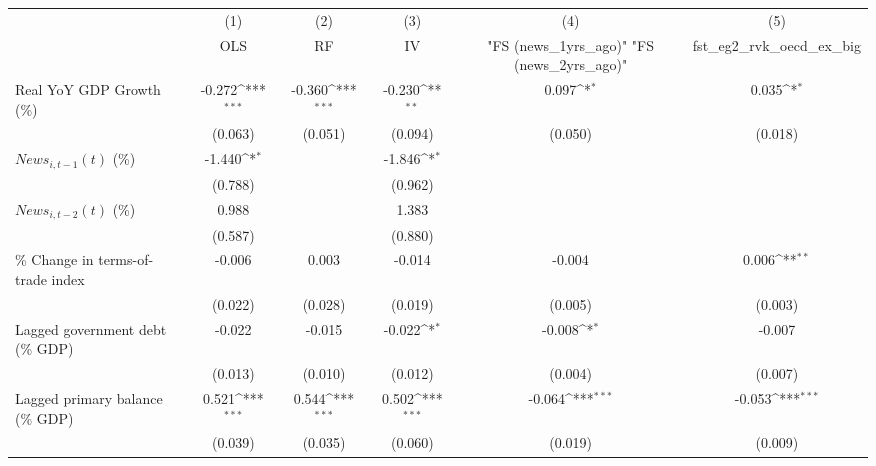 {
\def\sym#1{\ifmmode^{#1}\else\(^{#1}\)\fi}
\begin{tabular}{l*{5}{c}}
\toprule
                    &\multicolumn{1}{c}{(1)}&\multicolumn{1}{c}{(2)}&\multicolumn{1}{c}{(3)}&\multicolumn{1}{c}{(4)}&\multicolumn{1}{c}{(5)}\\
                    &\multicolumn{1}{c}{OLS}&\multicolumn{1}{c}{RF}&\multicolumn{1}{c}{IV}&\multicolumn{1}{c}{ "FS (news_1yrs_ago)"  "FS (news_2yrs_ago)" }&\multicolumn{1}{c}{fst_eg2_rvk_oecd_ex_big}\\
\midrule
Real YoY GDP Growth (\%)&      -0.272\sym{***}&      -0.360\sym{***}&      -0.230\sym{**} &       0.097\sym{*}  &       0.035\sym{*}  \\
                    &     (0.063)         &     (0.051)         &     (0.094)         &     (0.050)         &     (0.018)         \\
\addlinespace
$ News_{i,t-1}(t)$ (\%)&      -1.440\sym{*}  &                     &      -1.846\sym{*}  &                     &                     \\
                    &     (0.788)         &                     &     (0.962)         &                     &                     \\
\addlinespace
$ News_{i,t-2}(t)$ (\%)&       0.988         &                     &       1.383         &                     &                     \\
                    &     (0.587)         &                     &     (0.880)         &                     &                     \\
\addlinespace
\% Change in terms-of-trade index&      -0.006         &       0.003         &      -0.014         &      -0.004         &       0.006\sym{**} \\
                    &     (0.022)         &     (0.028)         &     (0.019)         &     (0.005)         &     (0.003)         \\
\addlinespace
Lagged government debt (\% GDP)&      -0.022         &      -0.015         &      -0.022\sym{*}  &      -0.008\sym{*}  &      -0.007         \\
                    &     (0.013)         &     (0.010)         &     (0.012)         &     (0.004)         &     (0.007)         \\
\addlinespace
Lagged primary balance (\% GDP)&       0.521\sym{***}&       0.544\sym{***}&       0.502\sym{***}&      -0.064\sym{***}&      -0.053\sym{***}\\
                    &     (0.039)         &     (0.035)         &     (0.060)         &     (0.019)         &     (0.009)         \\

\end{tabular}}
